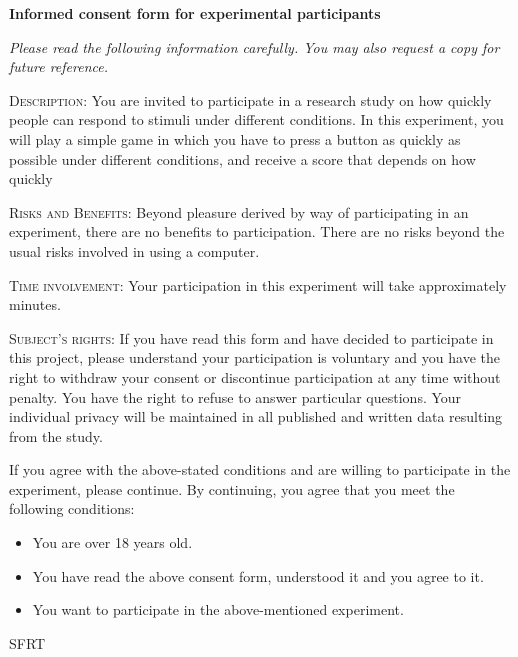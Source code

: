 \documentclass[a4paper,12pt]{article}
\begin{document}
\begin{center}
  {\huge \textbf{Informed consent form for experimental participants}}
\vspace{1cm}

\textit{Please read the following information carefully. You may also
  request a copy for future reference.}
\end{center}

\textsc{Description}: You are invited to participate in a research
study on how quickly people can respond to stimuli under different
conditions. In this experiment, you will play a simple game in which
you have to press a button as quickly as possible under different
conditions, and receive a score that depends on how quickly

\textsc{Risks and Benefits}: Beyond pleasure derived by way of
participating in an experiment, there are no benefits to
participation. There are no risks beyond the usual risks involved in
using a computer.

\textsc{Time involvement}: Your participation in this experiment will
take approximately \underline{\hspace{2em}} minutes.

\textsc{Subject's rights}: If you have read this form and have decided
to participate in this project, please understand your participation
is voluntary and you have the right to withdraw your consent or
discontinue participation at any time without penalty. You have the
right to refuse to answer particular questions. Your individual
privacy will be maintained in all published and written data resulting
from the study.

If you agree with the above-stated conditions and are willing to
participate in the experiment, please continue. By continuing, you
agree that you meet the following conditions:
\begin{itemize}
\item You are over 18 years old.
\item You have read the above consent form, understood it and you agree to it.
\item You want to participate in the above-mentioned experiment.
\end{itemize}
\vfill
\hfill
SFRT
\end{document}
